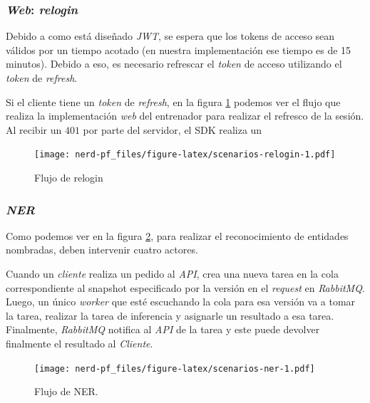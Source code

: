 \documentclass[12pt,a4paper,]{scrartcl}
\begin{document}
\hypertarget{web-relogin}{%
\subsubsection{\texorpdfstring{\emph{Web}: \emph{relogin}}{Web: relogin}}\label{web-relogin}}

Debido a como está diseñado \emph{JWT}, se espera que los tokens de acceso sean válidos por un tiempo acotado (en nuestra implementación ese tiempo es de 15 minutos). Debido a eso, es necesario refrescar el \emph{token} de acceso utilizando el \emph{token} de \emph{refresh}.

Si el cliente tiene un \emph{token} de \emph{refresh}, en la figura \ref{fig:scenarios-relogin} podemos ver el flujo que realiza la implementación \emph{web} del entrenador para realizar el refresco de la sesión. Al recibir un \(401\) por parte del servidor, el SDK realiza un

\begin{figure}[H]

{\centering \texttt{[image: nerd-pf\_files/figure-latex/scenarios-relogin-1.pdf]} 

}

\caption{Flujo de relogin}\label{fig:scenarios-relogin}
\end{figure}

\hypertarget{ner}{%
\subsubsection{\texorpdfstring{\emph{NER}}{NER}}\label{ner}}

Como podemos ver en la figura \ref{fig:scenarios-ner}, para realizar el reconocimiento de entidades nombradas, deben intervenir cuatro actores.

Cuando un \emph{cliente} realiza un pedido al \emph{API}, crea una nueva tarea en la cola correspondiente al snapshot especificado por la versión en el \emph{request} en \emph{RabbitMQ}. Luego, un único \emph{worker} que esté escuchando la cola para esa versión va a tomar la tarea, realizar la tarea de inferencia y asignarle un resultado a esa tarea. Finalmente, \emph{RabbitMQ} notifica al \emph{API} de la tarea y este puede devolver finalmente el resultado al \emph{Cliente}.

\begin{figure}[H]

{\centering \texttt{[image: nerd-pf\_files/figure-latex/scenarios-ner-1.pdf]} 

}

\caption{Flujo de NER.}\label{fig:scenarios-ner}
\end{figure}
\end{document}
